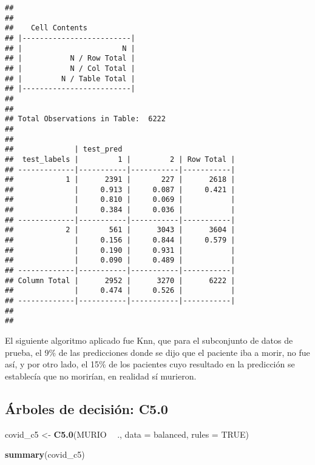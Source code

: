 \documentclass[]{article}
\newenvironment{Shaded}{\begin{snugshade}}{\end{snugshade}}
\newcommand{\DataTypeTok}[1]{\textcolor[rgb]{0.13,0.29,0.53}{#1}}
\newcommand{\KeywordTok}[1]{\textcolor[rgb]{0.13,0.29,0.53}{\textbf{#1}}}
\newcommand{\NormalTok}[1]{#1}
\newcommand{\OperatorTok}[1]{\textcolor[rgb]{0.81,0.36,0.00}{\textbf{#1}}}
\newcommand{\OtherTok}[1]{\textcolor[rgb]{0.56,0.35,0.01}{#1}}
\newcommand{\StringTok}[1]{\textcolor[rgb]{0.31,0.60,0.02}{#1}}
\begin{document}
\begin{verbatim}
## 
##  
##    Cell Contents
## |-------------------------|
## |                       N |
## |           N / Row Total |
## |           N / Col Total |
## |         N / Table Total |
## |-------------------------|
## 
##  
## Total Observations in Table:  6222 
## 
##  
##              | test_pred 
##  test_labels |         1 |         2 | Row Total | 
## -------------|-----------|-----------|-----------|
##            1 |      2391 |       227 |      2618 | 
##              |     0.913 |     0.087 |     0.421 | 
##              |     0.810 |     0.069 |           | 
##              |     0.384 |     0.036 |           | 
## -------------|-----------|-----------|-----------|
##            2 |       561 |      3043 |      3604 | 
##              |     0.156 |     0.844 |     0.579 | 
##              |     0.190 |     0.931 |           | 
##              |     0.090 |     0.489 |           | 
## -------------|-----------|-----------|-----------|
## Column Total |      2952 |      3270 |      6222 | 
##              |     0.474 |     0.526 |           | 
## -------------|-----------|-----------|-----------|
## 
## 
\end{verbatim}

El siguiente algoritmo aplicado fue Knn, que para el subconjunto de
datos de prueba, el 9\% de las predicciones donde se dijo que el
paciente iba a morir, no fue así, y por otro lado, el 15\% de los
pacientes cuyo resultado en la predicción se establecía que no morirían,
en realidad sí murieron.

\hypertarget{uxe1rboles-de-decisiuxf3n-c5.0}{%
\subsection{Árboles de decisión:
C5.0}\label{uxe1rboles-de-decisiuxf3n-c5.0}}

\begin{Shaded}
\begin{Highlighting}[]
\NormalTok{covid_c5 <-}\StringTok{ }\KeywordTok{C5.0}\NormalTok{(MURIO }\OperatorTok{~}\StringTok{ }\NormalTok{., }\DataTypeTok{data =}\NormalTok{ balanced, }\DataTypeTok{rules =} \OtherTok{TRUE}\NormalTok{)}
\end{Highlighting}
\end{Shaded}

\begin{Shaded}
\begin{Highlighting}[]
\KeywordTok{summary}\NormalTok{(covid_c5)}
\end{Highlighting}
\end{Shaded}
\end{document}
